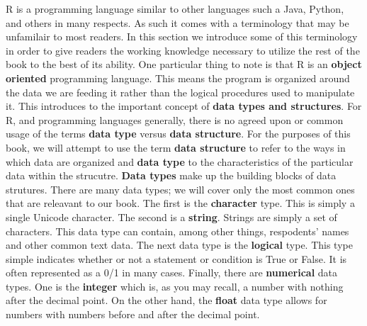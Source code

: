 \documentclass[11pt,openany]{book}\usepackage[]{graphicx}\usepackage[]{color}
\begin{document}
R is a programming language similar to other languages such a Java, Python, and others in many respects. As such it comes with a terminology that may be unfamilair to most readers. In this section we introduce some of this terminology in order to give readers the working knowledge necessary to utilize the rest of the book to the best of its ability. One particular thing to note is that R is an \textbf{object oriented} programming language. This means the program is organized around the data we are feeding it rather than the logical procedures used to manipulate it. This introduces to the important concept of \textbf{data types and structures}. For R, and programming languages generally, there is no agreed upon or common usage of the terms \textbf{data type} versus \textbf{data structure}. For the purposes of this book, we will attempt to use the term \textbf{data structure} to refer to the ways in which data are organized and \textbf{data type} to the characteristics of the particular data within the strucutre. \textbf{Data types} make up the building blocks of data strutures. There are many data types; we will cover only the most common ones that are releavant to our book. The first is the \textbf{character} type. This is simply a single Unicode character. The second is a \textbf{string}. Strings are simply a set of characters. This data type can contain, among other things, respodents' names and other common text data. The next data type is the \textbf{logical} type. This type simple indicates whether or not a statement or condition is True or False. It is often represented as a 0/1 in many cases. Finally, there are \textbf{numerical} data types. One is the \textbf{integer} which is, as you may recall, a number with nothing after the decimal point. On the other hand, the \textbf{float} data type allows for numbers with numbers before and after the decimal point.
\end{document}
